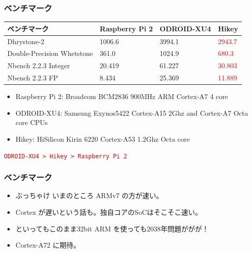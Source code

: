 \documentclass[cjk,dvipdfmx,10pt,compress,%
hyperref={bookmarks=true,bookmarksnumbered=true,bookmarksopen=false,%
colorlinks=false,%
pdftitle={第 103 回 関西 Debian 勉強会},%
pdfauthor={岩松 信洋},%
pdfsubject={資料},%
}]{beamer}
\begin{document}
\begin{frame}[fragile]
  \frametitle{ベンチマーク}

\begin{table}[htb]
  \begin{tabular}{|l|l|l||l|} \hline
    ベンチマーク  & Raspberry Pi 2 & ODROID-XU4 & Hikey  \\ \hline \hline
    Dhrystone-2 & 1006.6 & 3994.1 & \textcolor{red}{2943.7} \\ \hline
    Double-Precision Whetstone & 361.0 & 1024.9 & \textcolor{red}{680.3} \\ \hline
    Nbench 2.2.3 Integer  & 20.419 & 61.227  & \textcolor{red}{30.803} \\ \hline
    Nbench 2.2.3 FP  & 8.434 & 25.369 & \textcolor{red}{11.889} \\ \hline
  \end{tabular}
\end{table}

\begin{itemize}
\item Raspberry Pi 2: Broadcom BCM2836 900MHz  ARM Cortex-A7 4 core
\item ODROID-XU4: Samsung Exynos5422 Cortex-A15 2Ghz and Cortex-A7 Octa core CPUs
\item Hikey: HiSilicon Kirin 6220 Cortex-A53 1.2Ghz Octa core
\end{itemize}

 \pause

 \begin{center}
 \textcolor{red}{\texttt{ODROID-XU4 > Hikey > Raspberry Pi 2}}
 \end{center}

\end{frame}


\begin{frame}[fragile]
  \frametitle{ベンチマーク}
  \begin{itemize}
  \item ぶっちゃけ いまのところ ARMv7 の方が速い。
  \item Cortex が遅いという話も。独自コアのSoCはそこそこ速い。
  \item といってもこのまま32bit ARM を使っても2038年問題ががが！
  \item Cortex-A72 に期待。
  \end{itemize}
\end{frame}
\end{document}

